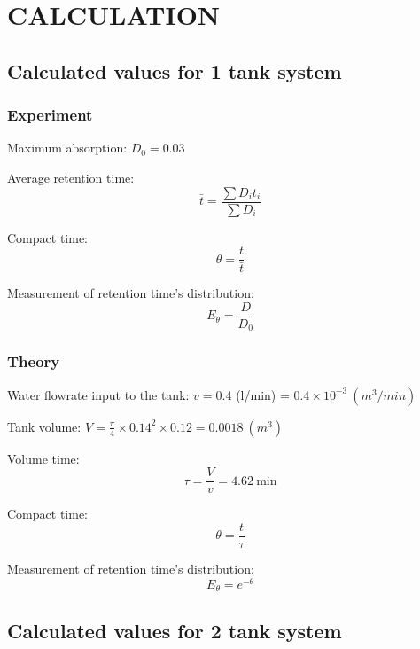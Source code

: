 \section{CALCULATION}

\subsection{Calculated values for 1 tank system}
\subsubsection{Experiment}
Maximum absorption: $D_0 = 0.03$

Average retention time:
\begin{equation}
    \bar{t} = \frac{\sum D_i t_i}{\sum D_i}
\end{equation}

Compact time:
\begin{equation}
    \theta = \frac{t}{\bar{t}}
\end{equation}

Measurement of retention time's distribution:
\begin{equation}
    E_{\theta} = \frac{D}{D_0}
\end{equation}

\subsubsection{Theory}
Water flowrate input to the tank: $v = 0.4$ (l/min) = $0.4 \times 10^{-3}~(m^3/min)$

Tank volume: $V = \frac{\pi}{4} \times 0.14^2 \times 0.12 = 0.0018~(m^3)$

Volume time:
\begin{equation}
    \tau = \frac{V}{v} = 4.62~\text{min}
\end{equation}

Compact time:
\begin{equation}
    \theta = \frac{t}{\tau}
\end{equation}

Measurement of retention time's distribution:
\begin{equation}
    E_{\theta} = e^{-\theta}
\end{equation}

\subsection{Calculated values for 2 tank system}

